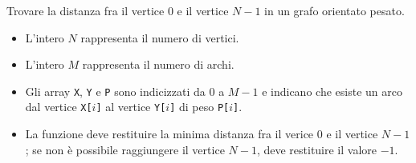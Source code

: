 \usepackage{xcolor}
\usepackage{afterpage}
\usepackage{pifont,mdframed}
\usepackage[bottom]{footmisc}

\usepackage{amsmath}
\usepackage{amsthm}
\usepackage{amssymb}
\usepackage{mathtools}



\newcommand{\inputfile}{\texttt{stdin}}
\newcommand{\outputfile}{\texttt{stdout}}

\newenvironment{warning}
  {\par\begin{mdframed}[linewidth=2pt,linecolor=gray]%
    \begin{list}{}{\leftmargin=1cm
                   \labelwidth=\leftmargin}\item[\Large\ding{43}]}
  {\end{list}\end{mdframed}\par}


Trovare la distanza fra il vertice $0$ e il vertice $N-1$ in un grafo orientato pesato.



\begin{itemize}[nolistsep]
  \item L'intero $N$ rappresenta il numero di vertici.
  \item L'intero $M$ rappresenta il numero di archi.
  \item Gli array \texttt{X}, \texttt{Y} e \texttt{P} sono indicizzati da $0$ a $M-1$ e indicano che esiste un arco dal vertice \texttt{X[$i$]} al vertice \texttt{Y[$i$]} di peso \texttt{P[$i$]}.
  \item La funzione deve restituire la minima distanza fra il verice $0$ e il vertice $N-1$; se non è possibile raggiungere il vertice $N-1$, deve restituire il valore $-1$.
\end{itemize}

\medskip



